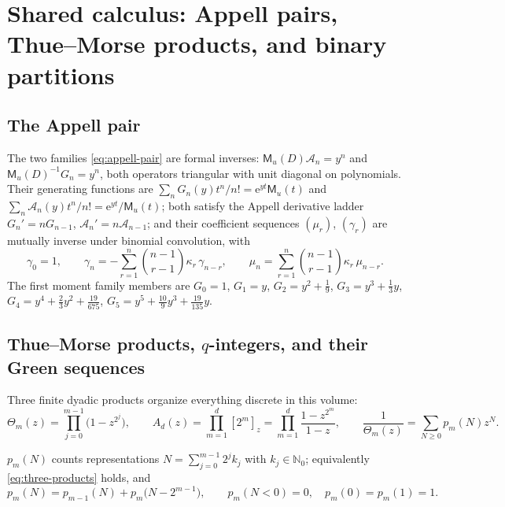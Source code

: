 \documentclass[11pt,oneside]{article}
\numberwithin{equation}{section}
\theoremstyle{definition}
\theoremstyle{remark}
\newcommand{\N}{\mathbb N}
\newcommand{\e}{\mathrm e}
\newcommand{\ThetaTM}{\Theta}
\newcommand{\MM}{\mathsf M}
\newcommand{\Gd}{\mathcal A}
\begin{document}
\section{Shared calculus: Appell pairs, Thue--Morse products, and
binary partitions}
\label{sec:shared}

\subsection{The Appell pair}

The two families \eqref{eq:appell-pair} are formal inverses:
$\MM_u(D)\Gd_n=y^{n}$ and $\MM_u(D)^{-1}G_n=y^{n}$, both operators
triangular with unit diagonal on polynomials.  Their generating
functions are
$\sum_nG_n(y)t^{n}/n!=\e^{yt}\MM_u(t)$ and
$\sum_n\Gd_n(y)t^{n}/n!=\e^{yt}/\MM_u(t)$; both satisfy the Appell
derivative ladder $G_n'=nG_{n-1}$, $\Gd_n'=n\Gd_{n-1}$; and their
coefficient sequences $(\mu_r)$, $(\gamma_r)$ are mutually inverse
under binomial convolution, with
\begin{equation}
 \gamma_0=1,\qquad
 \gamma_n=-\sum_{r=1}^{n}\binom{n-1}{r-1}\kappa_r\,\gamma_{n-r},
 \qquad
 \mu_n=\sum_{r=1}^{n}\binom{n-1}{r-1}\kappa_r\,\mu_{n-r}.
 \label{eq:gamma-mu-recurrences}
\end{equation}
The first moment family members are $G_0=1$, $G_1=y$,
$G_2=y^{2}+\tfrac19$, $G_3=y^{3}+\tfrac13y$,
$G_4=y^{4}+\tfrac23y^{2}+\tfrac{19}{675}$,
$G_5=y^{5}+\tfrac{10}9y^{3}+\tfrac{19}{135}y$.

\subsection{Thue--Morse products, $q$-integers, and their Green
sequences}

Three finite dyadic products organize everything discrete in this
volume:
\begin{equation}
 \ThetaTM_m(z)=\prod_{j=0}^{m-1}\bigl(1-z^{2^{j}}\bigr),
 \qquad
 A_d(z)=\prod_{m=1}^{d}[2^{m}]_z
 =\prod_{m=1}^{d}\frac{1-z^{2^{m}}}{1-z},
 \qquad
 \frac{1}{\ThetaTM_m(z)}=\sum_{N\ge0}p_m(N)z^{N}.
 \label{eq:three-products}
\end{equation}

\begin{definition}
\label{def:pm}
$p_m(N)$ counts representations $N=\sum_{j=0}^{m-1}2^{j}k_j$ with
$k_j\in\N_0$; equivalently \eqref{eq:three-products} holds, and
\begin{equation}
 p_m(N)=p_{m-1}(N)+p_m\bigl(N-2^{m-1}\bigr),
 \qquad p_m(N<0)=0,\quad p_m(0)=p_m(1)=1.
 \label{eq:pm-def}
\end{equation}
\end{definition}
\end{document}

